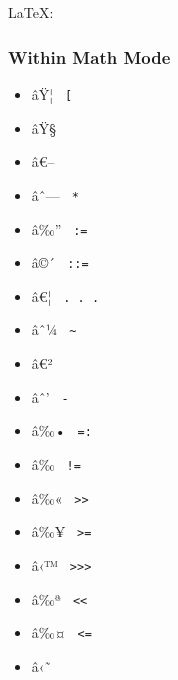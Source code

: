 LaTeX: \texttt{\ }

{ }

\subsubsection{Within Math Mode}\label{within-math-mode}

\begin{itemize}
\tightlist
\item
  \label{symbol-bracket.l.double}{{ âŸ¦ }
  \texttt{\ {[}\textbar{}\ }}
\item
  \label{symbol-bracket.r.double}{{ âŸ§ }
  \texttt{\ \textbar{}{]}\ }}
\item
  \label{symbol-bar.v.double}{{ â€-- }
  \texttt{\ \textbar{}\textbar{}\ }}
\item
  \label{symbol-ast.op}{{ âˆ--- } \texttt{\ *\ }}
\item
  \label{symbol-colon.eq}{{ â‰'' } \texttt{\ :=\ }}
\item
  \label{symbol-colon.double.eq}{{ â©´ }
  \texttt{\ ::=\ }}
\item
  \label{symbol-dots.h}{{ â€¦ } \texttt{\ .\ .\ .\ }}
\item
  \label{symbol-tilde.op}{{ âˆ¼ }
  \texttt{\ \textasciitilde{}\ }}
\item
  \label{symbol-prime}{{ â€² }
  \texttt{\ \textquotesingle{}\ }}
\item
  \label{symbol-minus}{{ âˆ' } \texttt{\ -\ }}
\item
  \label{symbol-eq.colon}{{ â‰• } \texttt{\ =:\ }}
\item
  \label{symbol-eq.not}{{ â‰ } \texttt{\ !=\ }}
\item
  \label{symbol-gt.double}{{ â‰« }
  \texttt{\ \textgreater{}\textgreater{}\ }}
\item
  \label{symbol-gt.eq}{{ â‰¥ }
  \texttt{\ \textgreater{}=\ }}
\item
  \label{symbol-gt.triple}{{ â‹™ }
  \texttt{\ \textgreater{}\textgreater{}\textgreater{}\ }}
\item
  \label{symbol-lt.double}{{ â‰ª }
  \texttt{\ \textless{}\textless{}\ }}
\item
  \label{symbol-lt.eq}{{ â‰¤ } \texttt{\ \textless{}=\ }}
\item
  \label{symbol-lt.triple}{{ â‹˜ }
}
\end{itemize}

